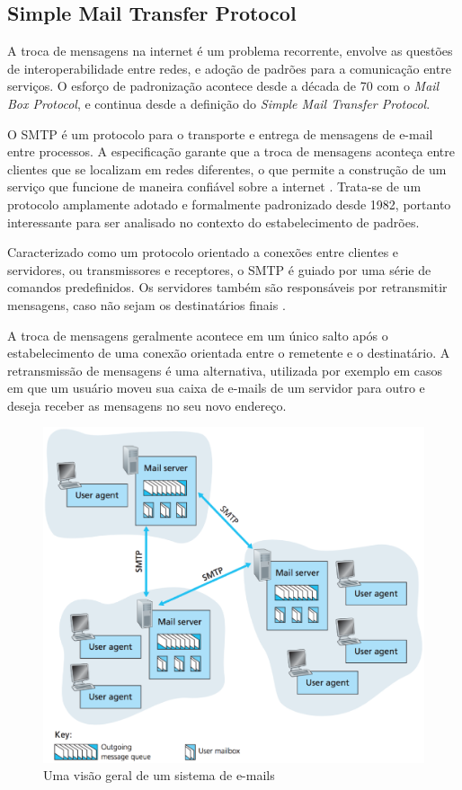 \subsection{Simple Mail Transfer Protocol}

A troca de mensagens na internet é um problema recorrente, envolve as questões de
interoperabilidade entre redes, e adoção de padrões para a comunicação entre
serviços. O esforço de padronização acontece desde a década de 70 com o \textit{Mail
Box Protocol}, e continua desde a definição do \textit{Simple Mail Transfer
Protocol}.

O SMTP é um protocolo para o transporte e entrega de mensagens de e-mail entre
processos. A especificação garante que a troca de mensagens aconteça entre clientes
que se localizam em redes diferentes, o que permite a construção de um serviço que
funcione de maneira confiável sobre a internet \cite{rfc2821}. Trata-se de um
protocolo amplamente adotado e formalmente padronizado desde 1982, portanto
interessante para ser analisado no contexto do estabelecimento de padrões.

Caracterizado como um protocolo orientado a conexões entre clientes e servidores, ou
transmissores e receptores, o SMTP é guiado por uma série de comandos predefinidos.
Os servidores também são responsáveis por retransmitir mensagens, caso não sejam os
destinatários finais \cite{kurose2012}.

A troca de mensagens geralmente acontece em um único salto após o estabelecimento de
uma conexão orientada entre o remetente e o destinatário. A retransmissão de
mensagens é uma alternativa, utilizada por exemplo em casos em que um usuário moveu
sua caixa de e-mails de um servidor para outro e deseja receber as mensagens no seu
novo endereço.

\begin{figure}[h]
	\centering
		\includegraphics[keepaspectratio=true,scale=0.6]{figuras/smtp_internet.eps}
	\caption{Uma visão geral de um sistema de e-mails \cite{kurose2012}}
	\label{fig:smtpInternet}
\end{figure}


